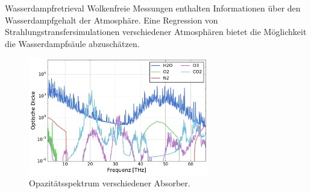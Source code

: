 \documentclass{beamer}
\begin{document}
\begin{frame}{Wasserdampfretrieval}
Wolkenfreie Messungen enthalten Informationen über den Wasserdampfgehalt der
Atmosphäre. Eine Regression von Strahlungstransfersimulationen verschiedener
Atmosphären bietet die Möglichkeit die Wasserdampfsäule abzuschätzen.

\begin{figure}[ht]
    \centering
    \includegraphics[width=0.7\textwidth]{figures/midlatitude-summer_opacity.pdf}
    \caption{Opazitätsspektrum verschiedener Absorber.}
    \label{fig:opacity}
\end{figure}
\end{frame}
\end{document}
